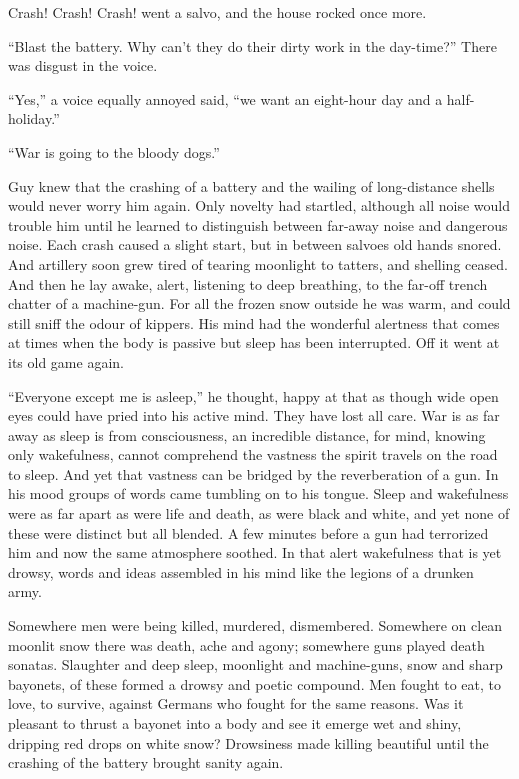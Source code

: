 Crash! Crash! Crash! went a salvo, and the house rocked once more.

``Blast the battery. Why can't they do their dirty work in the day-time?'' There was disgust in the 
voice.

``Yes,'' a voice equally annoyed said, ``we want an eight-hour day and a half-holiday.''

``War is going to the bloody dogs.''

Guy knew that the crashing of a battery and the wailing of long-distance shells would never worry him 
again. Only novelty had startled, although all noise would trouble him until he learned to distinguish 
between far-away noise and dangerous noise. Each crash caused a slight start, but in between salvoes 
old hands snored. And artillery soon grew tired of tearing moonlight to tatters, and shelling ceased. 
And then he lay awake, alert, listening to deep breathing, to the far-off trench chatter of a machine-gun.
For all the frozen snow outside he was warm, and could still sniff the odour of kippers. His mind had 
the wonderful alertness that comes at times when the body is passive but sleep has been interrupted. 
Off it went at its old game again.

``Everyone except me is asleep,'' he thought, happy at that as though wide open eyes could have pried into 
his active mind. They have lost all care. War is as far away as sleep is from consciousness, an incredible 
distance, for mind, knowing only wakefulness, cannot comprehend the vastness the spirit travels on the 
road to sleep. And yet that vastness can be bridged by the reverberation of a gun. In his mood groups of words came tumbling on to his tongue. Sleep and wakefulness were as far apart as were life and death, as were black 
and white, and yet none of these were distinct but all blended. A few minutes before a gun had terrorized him and now the same atmosphere soothed. In that alert wakefulness that is yet drowsy, words and ideas assembled in his mind like the legions of a drunken army.

Somewhere men were being killed, murdered, dismembered. Somewhere on clean moonlit snow there was death, ache and agony; somewhere guns played death sonatas. Slaughter and deep sleep, moonlight and machine-guns, snow and 
sharp bayonets, of these formed a drowsy and poetic compound. Men fought to eat, to love, to survive, against Germans who fought for the same reasons. Was it pleasant to thrust a bayonet into a body and see it emerge wet and shiny, dripping red drops on white snow? Drowsiness made killing beautiful until the crashing of the battery brought sanity again.

